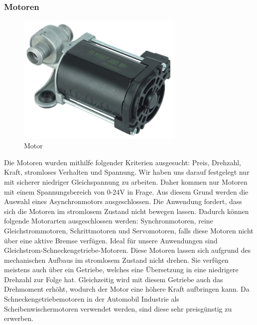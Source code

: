 \subsubsection{Motoren}
\begin{figure}[H] 
\begin{center}

\includegraphics[width=8cm]{Bilder/Bauteile/Motor}
\caption{Motor}
\label{Motor}

\end{center}
\end{figure}
Die Motoren wurden mithilfe folgender Kriterien ausgesucht: Preis, Drehzahl, Kraft, stromloses Verhalten und Spannung.
Wir haben uns  darauf festgelegt nur mit sicherer niedriger Gleichspannung zu arbeiten. Daher kommen nur Motoren mit einem Spannungsbereich von 0-24V in Frage. Aus diesem Grund werden die Auswahl eines Asynchronmotors ausgeschlossen. Die Anwendung fordert, dass sich die Motoren im stromlosem Zustand nicht bewegen lassen. Dadurch können folgende Motorarten ausgeschlossen werden: Synchronmotoren, reine Gleichstrommotoren, Schrittmotoren und Servomotoren, falls diese Motoren nicht über eine aktive Bremse verfügen. Ideal für unsere Anwendungen sind Gleichstrom-Schneckengetriebe-Motoren. Diese Motoren lassen sich aufgrund des mechanischen Aufbaus im stromlosem Zustand nicht drehen. Sie verfügen meistens auch über ein Getriebe, welches eine Übersetzung in eine niedrigere Drehzahl zur Folge hat. Gleichzeitig wird mit diesem Getriebe auch das Drehmoment erhöht, wodurch der Motor eine höhere Kraft aufbringen kann. Da Schneckengetriebemotoren in der Automobil Industrie als Scheibenwischermotoren verwendet werden, sind diese sehr preisgünstig zu erwerben.

